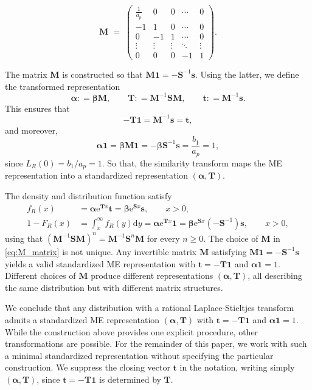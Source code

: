 \documentclass[a4paper,11pt]{article}
\numberwithin{equation}{section}
\theoremstyle{plain}
\theoremstyle{definition}
\newcommand{\1}{\mathbf{1}}
\newcommand{\e}{\mathrm{e}}
\newcommand{\dd}{\mathrm{d}}
\begin{document}
\begin{equation}\label{eq:M_matrix}
\bm{M} \;=\;
\begin{pmatrix}
\frac{1}{a_p} & 0 & 0 & \cdots & 0 \\
-1 & 1 & 0 & \cdots & 0 \\
0 & -1 & 1 & \cdots & 0 \\
\vdots & \vdots & \vdots & \ddots & \vdots \\
0 & 0 & 0 & -1 & 1
\end{pmatrix}.
\end{equation}


The matrix $\bm{M}$ is constructed so that $\bm{M}\bm{1}=-\bm{S}^{-1}\bm{s}$.
Using the latter, we define the transformed representation
\begin{equation}\label{eq:phlike_rep}
\bm{\alpha}: = \bm{\beta} \bm{M}, \qquad \bm{T}: = \bm{M}^{-1}\bm{S}\bm{M}, \qquad \bm{t}: = \bm{M}^{-1}\bm{s}.
\end{equation}
This ensures that
\[
-\bm{T}\bm{1}=\bm{M}^{-1}\bm{s}=\bm{t},
\]
and moreover,
\[
\bm{\alpha}\bm{1}=\bm{\beta}\bm{M}\bm{1}=-\bm{\beta}\bm{S}^{-1}\bm{s}=\frac{b_1}{a_p}=1,
\]
since $L_R(0)=b_1/a_p=1$.
So that, the similarity transform maps the ME representation into a standardized representation $(\bm{\alpha}, \bm{T})$.

The density and distribution function satisfy
\begin{align}
f_R(x) & = \bm{\alpha} \e^{\bm{T}x} \bm{t} = \bm{\beta} \e^{\bm{S}x} \bm{s}, \qquad x > 0,\label{eqnDensityOfME}\\
1-F_R(x) & = \int_x^\infty f_R(y) \dd y = \bm{\alpha} \e^{\bm{T}x} \bm{1} = \bm{\beta} \e^{\bm{S}x} (-\bm{S}^{-1})\bm{s}, \qquad x > 0,\label{eqnSurvivalOfME}
\end{align}
using that $(\bm{M}^{-1}\bm{S}\bm{M})^n=\bm{M}^{-1}\bm{S}^n\bm{M}$ for every $n\geq 0$.
The choice of $\bm{M}$ in \eqref{eq:M_matrix} is not unique. Any invertible matrix $\bm{M}$ satisfying $\bm{M}\bm{1}=-\bm{S}^{-1}\bm{s}$
yields a valid standardized ME representation with $\bm{t}=-\bm{T}\bm{1}$ and
$\bm{\alpha}\bm{1}=1$. Different choices of $\bm{M}$ produce different representations $(\bm{\alpha}, \bm{T})$, all describing the same distribution but with different matrix structures.

We conclude that any distribution with a rational Laplace-Stieltjes transform admits a standardized ME representation $(\bm{\alpha}, \bm{T})$ with $\bm{t} = -\bm{T}\bm{1}$ and $\bm{\alpha}\bm{1} = 1$.
While the construction above provides one explicit procedure, other transformations are possible. For the remainder of this paper, we work with such a minimal standardized representation without specifying the particular construction. We suppress the closing vector $\bm{t}$ in the notation, writing simply $(\bm{\alpha}, \bm{T})$, since $\bm{t} = -\bm{T}\bm{1}$ is determined by $\bm{T}$. 
\end{document}
